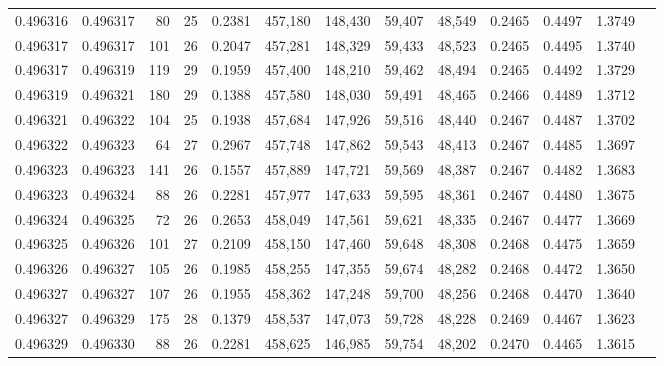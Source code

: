 \begin{tabular}{rrrrrrrrrrrrr}
0.496316 & 0.496317 &  80 &  25 &                                     0.2381 & 457,180 & 148,430 &  59,407 &  48,549 & 0.2465 & 0.4497 & 1.3749 \\
0.496317 & 0.496317 & 101 &  26 &                                     0.2047 & 457,281 & 148,329 &  59,433 &  48,523 & 0.2465 & 0.4495 & 1.3740 \\
0.496317 & 0.496319 & 119 &  29 &                                     0.1959 & 457,400 & 148,210 &  59,462 &  48,494 & 0.2465 & 0.4492 & 1.3729 \\
0.496319 & 0.496321 & 180 &  29 &                                     0.1388 & 457,580 & 148,030 &  59,491 &  48,465 & 0.2466 & 0.4489 & 1.3712 \\
0.496321 & 0.496322 & 104 &  25 &                                     0.1938 & 457,684 & 147,926 &  59,516 &  48,440 & 0.2467 & 0.4487 & 1.3702 \\
0.496322 & 0.496323 &  64 &  27 &                                     0.2967 & 457,748 & 147,862 &  59,543 &  48,413 & 0.2467 & 0.4485 & 1.3697 \\
0.496323 & 0.496323 & 141 &  26 &                                     0.1557 & 457,889 & 147,721 &  59,569 &  48,387 & 0.2467 & 0.4482 & 1.3683 \\
0.496323 & 0.496324 &  88 &  26 &                                     0.2281 & 457,977 & 147,633 &  59,595 &  48,361 & 0.2467 & 0.4480 & 1.3675 \\
0.496324 & 0.496325 &  72 &  26 &                                     0.2653 & 458,049 & 147,561 &  59,621 &  48,335 & 0.2467 & 0.4477 & 1.3669 \\
0.496325 & 0.496326 & 101 &  27 &                                     0.2109 & 458,150 & 147,460 &  59,648 &  48,308 & 0.2468 & 0.4475 & 1.3659 \\
0.496326 & 0.496327 & 105 &  26 &                                     0.1985 & 458,255 & 147,355 &  59,674 &  48,282 & 0.2468 & 0.4472 & 1.3650 \\
0.496327 & 0.496327 & 107 &  26 &                                     0.1955 & 458,362 & 147,248 &  59,700 &  48,256 & 0.2468 & 0.4470 & 1.3640 \\
0.496327 & 0.496329 & 175 &  28 &                                     0.1379 & 458,537 & 147,073 &  59,728 &  48,228 & 0.2469 & 0.4467 & 1.3623 \\
0.496329 & 0.496330 &  88 &  26 &                                     0.2281 & 458,625 & 146,985 &  59,754 &  48,202 & 0.2470 & 0.4465 & 1.3615 \\

\end{tabular}
